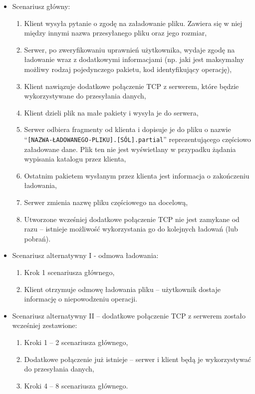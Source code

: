 \documentclass[10pt,a4paper]{article}
\newcommand{\quotes}[1]{``#1''}
\begin{document}
\begin{itemize}
    \item Scenariusz główny:
    \begin{enumerate}
        \item Klient wysyła pytanie o zgodę na załadowanie pliku. Zawiera się w niej między innymi nazwa przesyłanego pliku oraz jego rozmiar,
        \item Serwer, po zweryfikowaniu uprawnień użytkownika, wydaje zgodę na ładowanie wraz z dodatkowymi informacjami (np. jaki jest maksymalny możliwy rodzaj pojedynczego pakietu, kod identyfikujący operację),
        \item Klient nawiązuje dodatkowe połączenie TCP z serwerem, które będzie wykorzystywane do przesyłania danych,
        \item Klient dzieli plik na małe pakiety i wysyła je do serwera,
        \item Serwer odbiera fragmenty od klienta i dopisuje je do pliku o nazwie \quotes{\texttt{[NAZWA-ŁADOWANEGO-PLIKU].[SÓL].partial}} reprezentującego częściowo załadowane dane. Plik ten nie jest wyświetlany w przypadku żądania wypisania katalogu przez klienta,
        \item Ostatnim pakietem wysłanym przez klienta jest informacja o zakończeniu ładowania,
        \item Serwer zmienia nazwę pliku częściowego na docelową,
        \item Utworzone wcześniej dodatkowe połączenie TCP nie jest zamykane od razu -- istnieje możliwość wykorzystania go do kolejnych ładowań (lub pobrań).
    \end{enumerate}
    
    \item Scenariusz alternatywny I - odmowa ładowania:
    \begin{enumerate}
        \item Krok 1 scenariusza głównego,
        \item Klient otrzymuje odmowę ładowania pliku -- użytkownik dostaje informację o niepowodzeniu operacji.
    \end{enumerate}
    
    \item Scenariusz alternatywny II -- dodatkowe połączenie TCP z serwerem zostało wcześniej zestawione:
    \begin{enumerate}
        \item Kroki 1 -- 2 scenariusza głównego,
        \item Dodatkowe połączenie już istnieje -- serwer i klient będą je wykorzystywać do przesyłania danych,
        \item Kroki 4 -- 8 scenariusza głównego.
    \end{enumerate}
    

\end{itemize}
\end{document}
